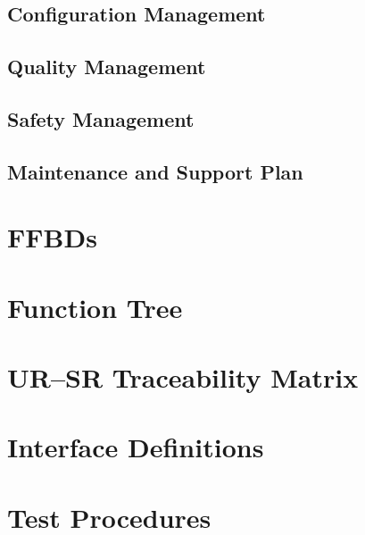 \documentclass[a4paper,10pt]{article} %
\begin{document}
\subsection{Configuration Management}

\subsection{Quality Management}

\subsection{Safety Management}

\subsection{Maintenance and Support Plan}

\newpage

\printbibliography

\newpage

\appendix

\section{FFBDs}

\section{Function Tree}

\section{UR--SR Traceability Matrix}

\section{Interface Definitions}

\section{Test Procedures}
\end{document}
